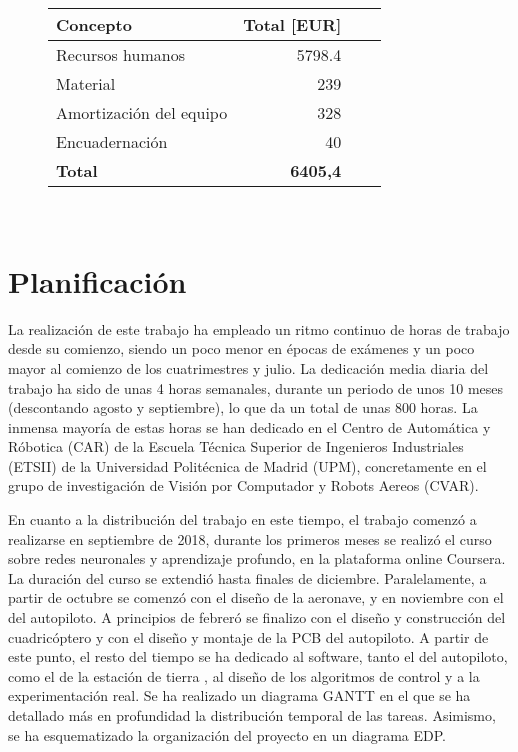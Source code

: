 \begin{figure}[htb!]
	\centering
	\begin{tabular}{|l|r|r|r|}
		\hline
		\textbf{Concepto} &Total [EUR]\\
		\hline
		Recursos humanos & 5798.4\\
		Material &239\\
		Amortización del equipo & 328\\
		Encuadernación&40\\
		
		\hline
		\textbf{Total}   & \textbf{6405,4}\\
		\hline
	\end{tabular}\\
\end{figure}





\section{Planificación}
La realización de este trabajo ha empleado un ritmo continuo de horas de trabajo desde su comienzo, siendo un poco menor en épocas de exámenes y un poco mayor al comienzo de los cuatrimestres y julio. La dedicación media diaria del trabajo ha sido de unas 4 horas semanales, durante un periodo de unos 10 meses (descontando agosto y septiembre), lo que da un total de unas 800 horas. La inmensa mayoría de estas horas se han dedicado en el Centro de Automática y Róbotica (CAR) de la Escuela Técnica Superior de Ingenieros Industriales (ETSII) de la Universidad Politécnica de Madrid (UPM), concretamente en el grupo de investigación de Visión por Computador y Robots Aereos (CVAR).

En cuanto a la distribución del trabajo en este tiempo, el trabajo comenzó a realizarse en septiembre de 2018, durante los primeros meses se realizó el curso sobre redes neuronales y aprendizaje profundo, en la plataforma online Coursera. La duración del curso se extendió hasta finales de diciembre. Paralelamente, a partir de octubre se comenzó con el diseño de la aeronave, y en noviembre con el del autopiloto. A principios de febreró se finalizo con el diseño y construcción del cuadricóptero y con el diseño y montaje de la PCB del autopiloto. A partir de este punto, el resto del tiempo se ha dedicado al software, tanto el del autopiloto, como el de la estación de tierra , al diseño de los algoritmos de control y a la experimentación real. Se ha realizado un diagrama GANTT  en el que se ha detallado más en profundidad la distribución temporal de las tareas. Asimismo, se ha esquematizado la organización del proyecto en un diagrama EDP. 


